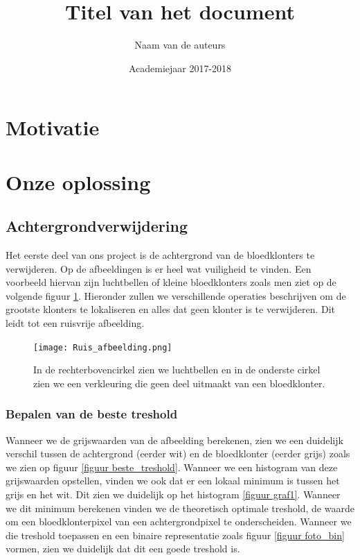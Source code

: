 \documentclass[a4paper,kulak]{kulakarticle}
\date{Academiejaar 2017-2018}
\title{Titel van het document}
\author{Naam van de auteurs}
\begin{document}
\maketitle

\section*{Motivatie}



\section{Onze oplossing}

\subsection{Achtergrondverwijdering}
Het eerste deel van ons project is de achtergrond van de bloedklonters te verwijderen. Op de afbeeldingen is er heel wat vuiligheid te vinden. Een voorbeeld hiervan zijn luchtbellen of kleine bloedklonters zoals men ziet op de volgende figuur \ref{figuur achtergrondverwijdering}. Hieronder zullen we verschillende operaties beschrijven om de grootste klonters te lokaliseren en alles dat geen klonter is te verwijderen. Dit leidt tot een ruisvrije afbeelding.

\begin{figure}[H]
	\centering
	\texttt{[image: Ruis\_afbeelding.png]}
	
	\caption{In de rechterbovencirkel zien we luchtbellen en in de onderste cirkel zien we een verkleuring die geen deel uitmaakt van een bloedklonter.}
	\label{figuur achtergrondverwijdering}
\end{figure}

\subsubsection{Bepalen van de beste treshold}
Wanneer we de grijswaarden van de afbeelding berekenen, zien we een duidelijk verschil tussen de achtergrond (eerder wit) en de bloedklonter (eerder grijs) zoals we zien op figuur \ref{figuur beste_treshold}. Wanneer we een histogram van deze grijswaarden opstellen, vinden we ook dat er een lokaal minimum is tussen het grijs en het wit. Dit zien we duidelijk op het histogram \ref{figuur graf1}. Wanneer we dit minimum berekenen vinden we de theoretisch optimale treshold, de waarde om een bloedklonterpixel van een achtergrondpixel te onderscheiden. Wanneer we die treshold toepassen en een binaire representatie zoals figuur \ref{figuur foto_bin} vormen, zien we duidelijk dat dit een goede treshold is.
\end{document}
